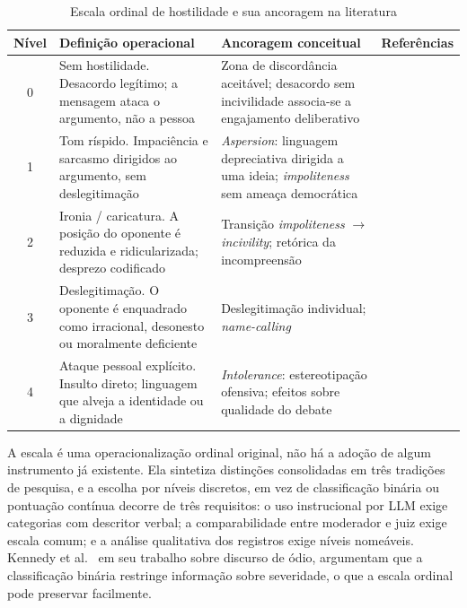 \documentclass[conference]{IEEEtran} \IEEEoverridecommandlockouts %
\begin{document}
\begin{table}[htbp]
\caption{Escala ordinal de hostilidade e sua ancoragem na literatura}
\begin{center}
\begin{tabularx}{\textwidth}{@{}c>{\raggedright\arraybackslash}X>{\raggedright\arraybackslash}Xl@{}}
\toprule
\textbf{Nível} & \textbf{Definição operacional} & \textbf{Ancoragem conceitual} & \textbf{Referências} \\
\midrule
0 & Sem hostilidade. Desacordo legítimo; a mensagem ataca o argumento, não a
    pessoa & Zona de discordância aceitável; desacordo sem incivilidade
    associa-se a engajamento deliberativo &
    \cite{papacharissi2004democracy,rossini2022beyond} \\
1 & Tom ríspido. Impaciência e sarcasmo dirigidos ao argumento, sem
    deslegitimação & \textit{Aspersion}: linguagem depreciativa dirigida a uma
    ideia; \textit{impoliteness} sem ameaça democrática &
    \cite{coe2014online,papacharissi2004democracy} \\
2 & Ironia / caricatura. A posição do oponente é reduzida e ridicularizada;
    desprezo codificado & Transição \textit{impoliteness} $\rightarrow$
    \textit{incivility}; retórica da incompreensão &
    \cite{rossini2022beyond,angenot2008dialogues,coe2014online} \\
3 & Deslegitimação. O oponente é enquadrado como irracional, desonesto ou
    moralmente deficiente & Deslegitimação individual; \textit{name-calling} &
    \cite{bentivegna2022searching,coe2014online,kenski2020perceptions} \\
4 & Ataque pessoal explícito. Insulto direto; linguagem que alveja a
    identidade ou a dignidade & \textit{Intolerance}: estereotipação ofensiva;
    efeitos sobre qualidade do debate &
    \cite{rossini2022beyond,kenski2020perceptions,mutz2005new} \\
\bottomrule
\end{tabularx}
\label{tab:escala}
\end{center}
\end{table}

A escala é uma operacionalização ordinal original, não há a adoção de algum 
instrumento já existente. Ela sintetiza distinções consolidadas em três tradições
de pesquisa, e a escolha por níveis discretos, em vez de classificação binária
ou pontuação contínua decorre de três requisitos: o uso instrucional por LLM
exige categorias com descritor verbal; a comparabilidade entre moderador e juiz
exige escala comum; e a análise qualitativa dos registros exige níveis
nomeáveis. Kennedy et al.~\cite{kennedy2020constructing} em seu trabalho sobre discurso de ódio, argumentam que a classificação binária restringe informação sobre severidade, o que a escala
ordinal pode preservar facilmente.
\end{document}
